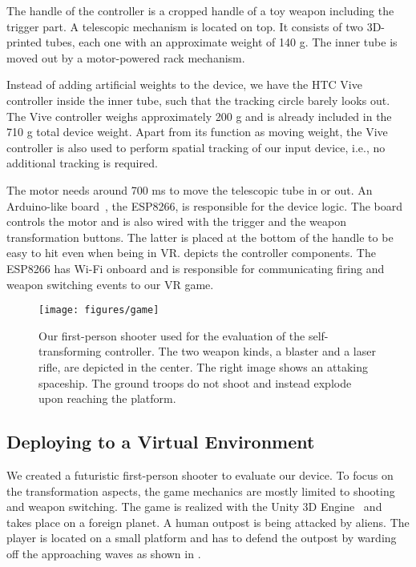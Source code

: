 \documentclass{sigchi}
\begin{document}
The handle of the controller is a cropped handle of a toy weapon including the trigger part. A telescopic mechanism is located on top. It consists of two 3D-printed tubes, each one with an approximate weight of 140 g. The inner tube is moved out by a motor-powered rack mechanism. 

Instead of adding artificial weights to the device, we have the HTC Vive controller inside the inner tube, such that the tracking circle barely looks out. The Vive controller weighs approximately 200 g and is already included in the 710 g total device weight. Apart from its function as moving weight, the Vive controller is also used to perform spatial tracking of our input device, i.e., no additional tracking is required.


The motor needs around 700 ms to move the telescopic tube in or out. An Arduino-like board~\cite{arduino}, the ESP8266, is responsible for the device logic. The board controls the motor and is also wired with the trigger and the weapon transformation buttons. The latter is placed at the bottom of the handle to be easy to hit even when being in VR.  depicts the controller components. The ESP8266 has Wi-Fi onboard and is responsible for communicating firing and weapon switching events to our VR game.





\begin{figure*}[t!]
\centering
\texttt{[image: figures/game]}
\caption{Our first-person shooter used for the evaluation of the self-transforming controller. The two weapon kinds, a blaster and a laser rifle, are depicted in the center. The right image shows an attaking spaceship. The ground troops do not shoot and instead explode upon reaching the platform.}
\label{fig:game}
\end{figure*}



\subsection{Deploying to a Virtual Environment}


We created a futuristic first-person shooter to evaluate our device. To focus on the transformation aspects, the game mechanics are mostly limited to shooting and weapon switching.
The game is realized with the Unity 3D Engine~\cite{unity} and takes place on a foreign planet. A human outpost is being attacked by aliens. The player is located on a small platform and has to defend the outpost by warding off the approaching waves as shown in . 
\end{document}
